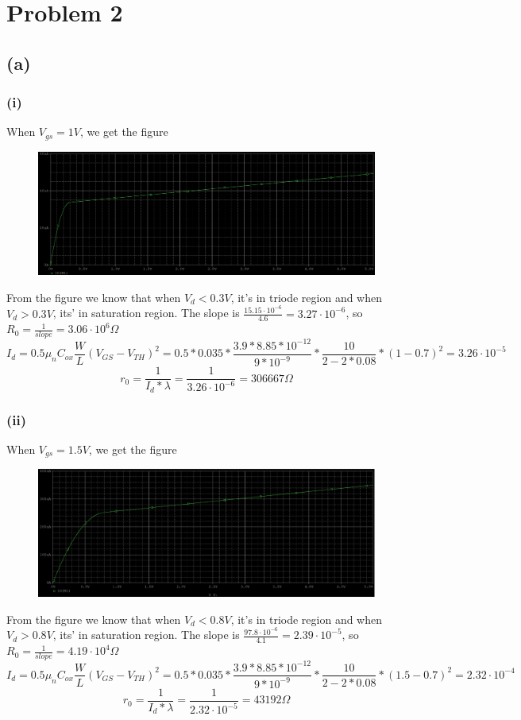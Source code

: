 \documentclass[12pt]{article}
\begin{document}
\newpage
\section{Problem 2}
\subsection{(a)}
\subsubsection{(i)}
When $V_{gs}=1V$, we get the figure
\begin{figure}[H]
\centering
\includegraphics[scale=0.23]{P1.png}
\end{figure}
From the figure we know that when $V_d<0.3V$, it's in triode region and when $V_d>0.3V$, its' in saturation region. The slope is $\frac{15.15\cdot10^{-6}}{4.6}=3.27\cdot10^{-6}$, so $R_0=\frac{1}{slope}=3.06\cdot10^{6}\Omega$
$$I_d=0.5\mu_nC_{ox}\frac{W}{L}(V_{GS}-V_{TH})^2=0.5*0.035*\frac{3.9*8.85*10^{-12}}{9*10^{-9}}*\frac{10}{2-2*0.08}*(1-0.7)^2=3.26\cdot10^{-5}$$
$$r_0=\frac{1}{I_d*\lambda}=\frac{1}{3.26\cdot10^{-6}}=306667\Omega$$
\subsubsection{(ii)}
When $V_{gs}=1.5V$, we get the figure
\begin{figure}[H]
\centering
\includegraphics[scale=0.23]{P2.png}
\end{figure}
From the figure we know that when $V_d<0.8V$, it's in triode region and when $V_d>0.8V$, its' in saturation region. The slope is $\frac{97.8\cdot10^{-6}}{4.1}=2.39\cdot10^{-5}$, so $R_0=\frac{1}{slope}=4.19\cdot10^{4}\Omega$
$$I_d=0.5\mu_nC_{ox}\frac{W}{L}(V_{GS}-V_{TH})^2=0.5*0.035*\frac{3.9*8.85*10^{-12}}{9*10^{-9}}*\frac{10}{2-2*0.08}*(1.5-0.7)^2=2.32\cdot10^{-4}$$
$$r_0=\frac{1}{I_d*\lambda}=\frac{1}{2.32\cdot10^{-5}}=43192\Omega$$
\end{document}
